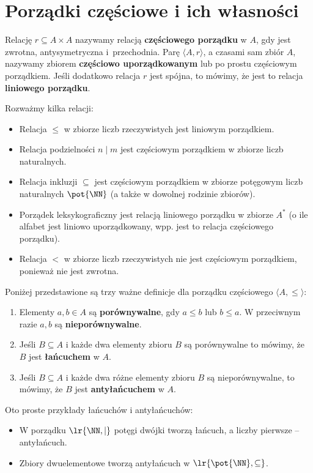 \section{Porządki częściowe i ich własności}
Relację $r \subseteq A \times A$ nazywamy relacją \textbf{częściowego porządku} w $A$, gdy jest zwrotna, antysymetryczna i~przechodnia. Parę $\langle A, r \rangle$, a czasami sam zbiór $A$, nazywamy zbiorem \textbf{częściowo uporządkowanym} lub po prostu częściowym porządkiem. Jeśli dodatkowo relacja $r$ jest spójna, to mówimy, że jest to relacja \textbf{liniowego porządku}.

\begin{example}
    Rozważmy kilka relacji:
    \begin{itemize}
        \item Relacja $\leq$ w zbiorze liczb rzeczywistych jest liniowym porządkiem.
        \item Relacja podzielności $n \; | \; m$ jest częściowym porządkiem w zbiorze liczb naturalnych.
        \item Relacja inkluzji $\subseteq$ jest częściowym porządkiem w zbiorze potęgowym liczb naturalnych $\pot{\NN}$ (a także w dowolnej rodzinie zbiorów).
        \item Porządek leksykograficzny jest relacją liniowego porządku w zbiorze $A^*$ (o ile alfabet jest liniowo uporządkowany, wpp. jest to relacja częściowego porządku).
        \item Relacja $<$ w zbiorze liczb rzeczywistych nie jest częściowym porządkiem, ponieważ nie jest zwrotna.
    \end{itemize}
\end{example}

Poniżej przedstawione są trzy ważne definicje dla porządku częściowego $\langle A, \leq \rangle$:
\begin{enumerate}
    \item Elementy $a, b \in A$ są \textbf{porównywalne}, gdy $a \leq b$ lub $b \leq a$. W przeciwnym razie $a, b$ są \textbf{nieporównywalne}.
    \item Jeśli $B \subseteq A$ i każde dwa elementy zbioru $B$ są porównywalne to mówimy, że $B$ jest \textbf{łańcuchem} w $A$.
    \item Jeśli $B \subseteq A$ i każde dwa różne elementy zbioru $B$ są nieporównywalne, to mówimy, że $B$ jest \textbf{antyłańcuchem} w $A$. 
\end{enumerate}

\begin{example}
    Oto proste przykłady łańcuchów i antyłańcuchów:
    \begin{itemize}
        \item W porządku $\lr{\NN, |}$ potęgi dwójki tworzą łańcuch, a liczby pierwsze -- antyłańcuch.
        \item Zbiory dwuelementowe tworzą antyłańcuch w $\lr{\pot{\NN}, \subseteq}$.
    \end{itemize}
\end{example}

